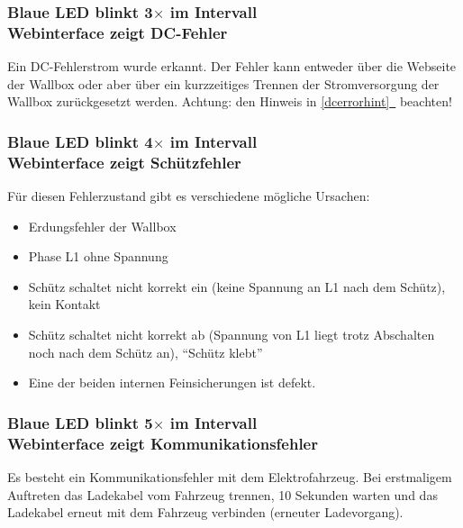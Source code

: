 \documentclass[a4paper,10pt]{article}
\newcommand*{\fullref}[1]{\hyperref[{#1}]{\ref*{#1}~\nameref*{#1}}}
\begin{document}
\begin{multicols*}{2}
	\begin{minipage}{\linewidth} %
		\subsubsection*{Blaue LED blinkt 3$\times$ im Intervall \\ Webinterface zeigt DC-Fehler}
		Ein DC-Fehlerstrom wurde erkannt. Der Fehler kann entweder über die Webseite der Wallbox oder aber über
		ein kurzzeitiges Trennen der Stromversorgung der Wallbox zurückgesetzt
		werden. Achtung: den Hinweis in \fullref{dcerrorhint} beachten!
	\end{minipage}

	\subsubsection*{Blaue LED blinkt 4$\times$ im Intervall \\ Webinterface zeigt Schützfehler}
	Für diesen Fehlerzustand gibt es verschiedene mögliche Ursachen:
	\begin{itemize}
		\item Erdungsfehler der Wallbox
		\item Phase L1 ohne Spannung
		\item Schütz schaltet nicht korrekt ein (keine Spannung an L1 nach dem Schütz), kein
		      Kontakt
		\item Schütz schaltet nicht korrekt ab (Spannung von L1 liegt trotz Abschalten noch
		      nach dem Schütz an), \enquote{Schütz klebt}
		\item Eine der beiden internen Feinsicherungen ist defekt.
	\end{itemize}

	\subsubsection*{Blaue LED blinkt 5$\times$ im Intervall \\ Webinterface zeigt Kommunikationsfehler}
	Es besteht ein Kommunikationsfehler mit dem Elektrofahrzeug. Bei erstmaligem
	Auftreten das Ladekabel vom Fahrzeug trennen, 10 Sekunden warten und das
	Ladekabel erneut mit dem Fahrzeug verbinden (erneuter Ladevorgang).


\end{multicols*}
\end{document}
